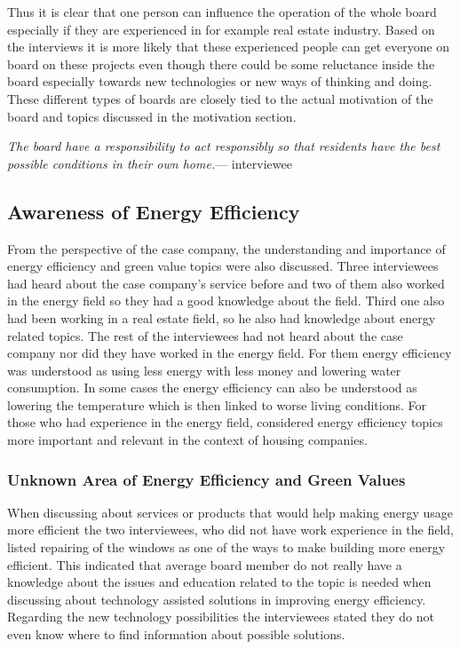 Thus it is clear that one person can influence the operation of the whole board especially if they are experienced in for example real estate industry. Based on the interviews it is more likely that these experienced people can get everyone on board on these projects even though there could be some reluctance inside the board especially towards new technologies or new ways of thinking and doing. These different types of boards are closely tied to the actual motivation of the board and topics discussed in the motivation section.

\begin{displayquote}
\textit{The board have a responsibility to act responsibly so that residents have the best possible conditions in their own home.}--- interviewee
\end{displayquote}

\subsection{Awareness of Energy Efficiency}

From the perspective of the case company, the understanding and importance of  energy efficiency and green value topics were also discussed. Three interviewees had heard about the case company's service before and two of them also worked in the energy field so they had a good knowledge about the field. Third one also had been working in a real estate field, so he also had knowledge about energy related topics. The rest of the interviewees had not heard about the case company nor did they have worked in the energy field. For them energy efficiency was understood as using less energy with less money and lowering water consumption. In some cases the energy efficiency can also be understood as lowering the temperature which is then linked to worse living conditions. For those who had experience in the energy field, considered energy efficiency topics more important and relevant in the context of housing companies.

\subsubsection*{Unknown Area of Energy Efficiency and Green Values}

When discussing about services or products that would help making energy usage more efficient the two interviewees, who did not have work experience in the field, listed repairing of the windows as one of the ways to make building more energy efficient. This indicated that average board member do not really have a knowledge about the issues and education related to the topic is needed when discussing about technology assisted solutions in improving energy efficiency. Regarding the new technology possibilities the interviewees stated they do not even know where to find information about possible solutions.

